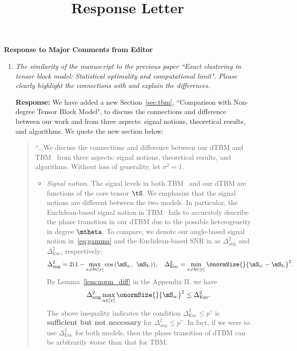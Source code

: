 \documentclass[11pt]{article}
\title{\textbf{Response Letter}}
\date{}
\theoremstyle{definition}
\theoremstyle{definition}
\newcommand{\of}[1]{\left(#1\right)}
\begin{document}
\maketitle
\vspace{-2cm}
\begin{center}
    \textbf{Response to Major Comments from Editor}
\end{center}

\begin{enumerate}[wide, labelwidth=!, labelindent=0pt]
\item \textit{The similarity of the manuscript to the previous paper ``Exact clustering in tensor block model: Statistical optimality and computational limit". Please clearly highlight the connections with \cite{han2020exact} and explain the differences.  }

\textbf{Response:} We have added a new Section~\ref{sec:tbm}, ``Comparison with Non-degree Tensor Block Model", to discuss the connections and difference between our work and \cite{han2020exact} from three aspects: signal notions, theoretical results, and algorithms. We quote the new section below:

\begin{quote}

``...We discuss the connections and difference between our dTBM and TBM~\citep{han2020exact} from three aspects: signal notions, theoretical results, and algorithms. Without loss of generality, let $\sigma^2=1$. 

\begin{itemize}[wide]
    \item \textit{Signal notion.} The signal levels in both TBM~\citep{han2020exact} and our dTBM are functions of the core tensor $\tS$. We emphasize that the signal notions are different between the two models. In particular, the Euclidean-based signal notion in TBM~\cite{han2020exact} fails to accurately describe the phase transition in our dTBM due to the possible heterogeneity in degree $\mtheta$. To compare, we denote our angle-based signal notion in~\eqref{eq:gamma} and the Euclidean-based SNR in \cite{han2020exact} as $\Delta_{\text{ang}}^2$ and $\Delta_{\text{Euc}}^2$, respectively:
\begin{equation}
     \Delta_{\text{ang}}^2 =  2(1 - \max_{a \neq b\in [r]}\cos \of{\mS_{a:},\  \mS_{b:}} ), \quad \Delta_{\text{Euc}}^2 = \min_{a \neq b \in [r]} \onormSize{}{\mS_{a:} - \mS_{b:}}^2.
\end{equation}
By Lemma~\ref{lem:norm_diff} in the Appendix II, we have 
\begin{equation}\label{eq:signalcompare}
     \Delta_{\text{ang}}^2  \max_{a \in [r]}\onormSize{}{\mS_{a:}}^2 \leq \Delta_{\text{Euc}}^2.
\end{equation}
The above inequality indicates the condition $\Delta_{\text{Euc}}^2 \leq p^{\gamma}$ is {\bf sufficient but not necessary} for $\Delta_{\text{ang}}^2 \leq p^{\gamma}$. In fact, if we were to use $\Delta_{\text{Euc}}^2$ for both models, then the phase transition of dTBM can be arbitrarily worse than that for TBM. 



\end{itemize}
\end{quote}
\end{enumerate}
\end{document}
